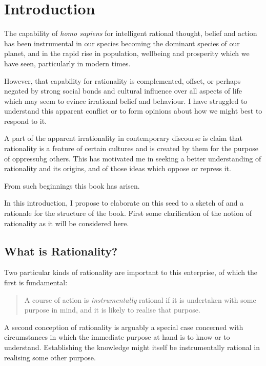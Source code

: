 \mainmatter
\chapter{Introduction }

The capability of \emph{homo sapiens} for intelligent rational thought, belief and action has been instrumental in our species becoming the dominant species of our planet, and in the rapid rise in population, wellbeing and prosperity which we have seen, particularly in modern times.

However, that capability for rationality is complemented, offset, or perhaps negated by strong social bonds and cultural influence over all aspects of life which may seem to evince irrational belief and behaviour.
I have struggled to understand this apparent conflict or to form opinions about how we might best to respond to it.

A part of the apparent irrationality in contemporary discourse is claim that rationality is a feature of certain cultures and is created by them for the purpose of oppressubg others.
This has motivated me in seeking a better understanding of rationality and its origins, and of those ideas which oppose or repress it.

From such beginnings this book has arisen.

In this introduction, I propose to elaborate on this seed to a sketch of and a rationale for the structure of the book.
First some clarification of the notion of rationality as it will be considered here.

\section{What is Rationality?}

Two particular kinds of rationality are important to this enterprise, of which the first is fundamental:

\begin{quote}
A course of action is \emph{instrumentally} rational if it is undertaken with some purpose in mind, and it is likely to realise that purpose.
\end{quote}

A second conception of rationality is arguably a special case concerned with circumstances in which the immediate purpose at hand is to know or to understand.
Establishing the knowledge might itself be instrumentally rational in realising some other purpose.

